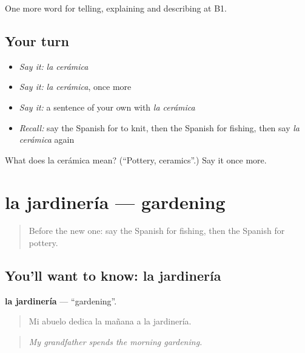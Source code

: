 \begin{grammarlens}[title={What you've built}]
One more word for telling, explaining and describing at B1.
\end{grammarlens}

\subsection*{Your turn}
\begin{itemize}
\raggedright
  \item \emph{Say it:} \emph{la cerámica}
  \item \emph{Say it:} \emph{la cerámica}, once more
  \item \emph{Say it:} a sentence of your own with \emph{la cerámica}
  \item \emph{Recall:} say the Spanish for to knit, then the Spanish for fishing, then say \emph{la cerámica} again
\end{itemize}

\begin{tcolorbox}[breakable,colback=teal!4,colframe=teal!35!black,title={Before you move on}]
What does la cerámica mean? (\textquotedblleft{}Pottery, ceramics\textquotedblright{}.) Say it once more.
\end{tcolorbox}
\section[la jardinería]{la jardinería — gardening}

\label{lesson:ES-C754-jardineria}



\begin{quote}
Before the new one: say the Spanish for fishing, then the Spanish for pottery.
\end{quote}

\subsection*{You'll want to know: la jardinería}
\textbf{la jardinería} — \textquotedblleft{}gardening\textquotedblright{}.

\begin{quote}
Mi abuelo dedica la mañana a la jardinería.
\end{quote}

\begin{quote}
\emph{My grandfather spends the morning gardening.}
\end{quote}

